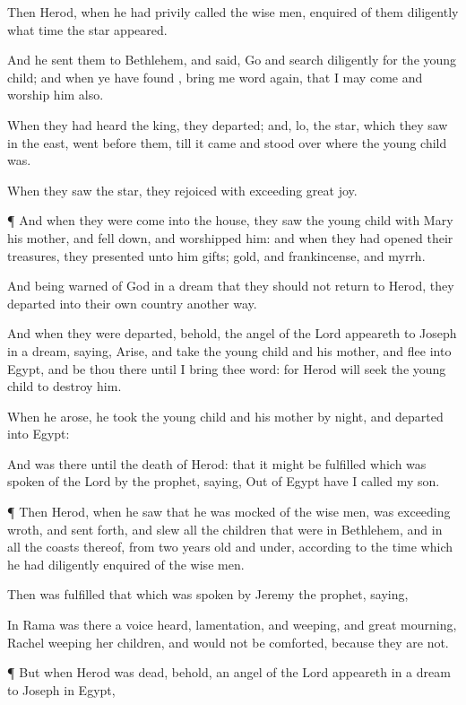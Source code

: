 {Then
Herod, when he
had
privily
called the wise
men,
enquired
of
them
diligently what
time the
star
appeared.

And he
sent
them
to
Bethlehem, and
said,
Go and
search
diligently
for the young
child;
and
when ye have
found
{},
bring
me word
again,
that
I may
come and
worship
him
also.

When they had
heard the
king, they
departed;
and,
lo, the
star,
which they
saw
in the
east, went
before
them,
till it
came and
stood
over
where the young
child
was.

When they
saw the
star, they
rejoiced with
exceeding
great
joy.


\par }{\PP {}¶
And when they were
come
into the
house, they
saw the young
child
with
Mary
his
mother,
and fell
down, and
worshipped
him: and
when they had
opened
their
treasures, they
presented unto
him
gifts;
gold,
and
frankincense,
and
myrrh.

And being warned of
God
in a
dream that they
should
not
return
to
Herod, they
departed
into their
own
country
another
way.

And
when
they were
departed,
behold, the
angel of the
Lord
appeareth to
Joseph
in a
dream,
saying,
Arise, and
take the young
child
and
his
mother,
and
flee
into
Egypt,
and be
thou
there
until I
bring
thee
word:
for
Herod
will
seek the young
child to
destroy
him.

When he
arose, he
took the young
child
and
his
mother by
night,
and
departed
into
Egypt:

And
was
there
until the
death of
Herod:
that it might be
fulfilled which was
spoken
of the
Lord
by the
prophet,
saying, Out
of
Egypt have I
called
my
son.


\par }{\PP {}¶
Then
Herod, when he
saw
that he was
mocked
of the wise
men,
was
exceeding
wroth,
and sent
forth, and
slew
all the
children that
were
in
Bethlehem,
and
in
all the
coasts
thereof,
from two years
old
and
under, according
to the
time
which he had diligently
enquired
of the wise
men.

Then was
fulfilled that which was
spoken
by
Jeremy the
prophet,
saying,

In
Rama was
there a
voice
heard,
lamentation,
and
weeping,
and
great
mourning,
Rachel
weeping
{}
her
children,
and
would
not be
comforted,
because they
are
not.


\par }{\PP {}¶ But
when
Herod was
dead,
behold, an
angel of the
Lord
appeareth
in a
dream to
Joseph
in
Egypt,

}
